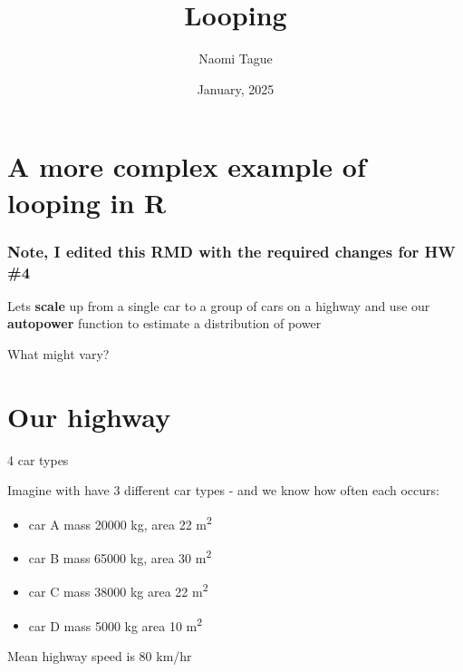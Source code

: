 \documentclass[
]{article}
\title{Looping}
\author{Naomi Tague}
\date{January, 2025}
\begin{document}
\maketitle

\section{A more complex example of looping in
R}\label{a-more-complex-example-of-looping-in-r}

\subsubsection{Note, I edited this RMD with the required changes for HW
\#4}\label{note-i-edited-this-rmd-with-the-required-changes-for-hw-4}

Lets \textbf{scale} up from a single car to a group of cars on a highway
and use our \textbf{autopower} function to estimate a distribution of
power

What might vary?

\section{Our highway}\label{our-highway}

4 car types

Imagine with have 3 different car types - and we know how often each
occurs:

\begin{itemize}
\item
  car A mass 20000 kg, area 22 m\textsuperscript{2}
\item
  car B mass 65000 kg, area 30 m\textsuperscript{2}
\item
  car C mass 38000 kg area 22 m\textsuperscript{2}
\item
  car D mass 5000 kg area 10 m\textsuperscript{2}
\end{itemize}

Mean highway speed is 80 km/hr
\end{document}
